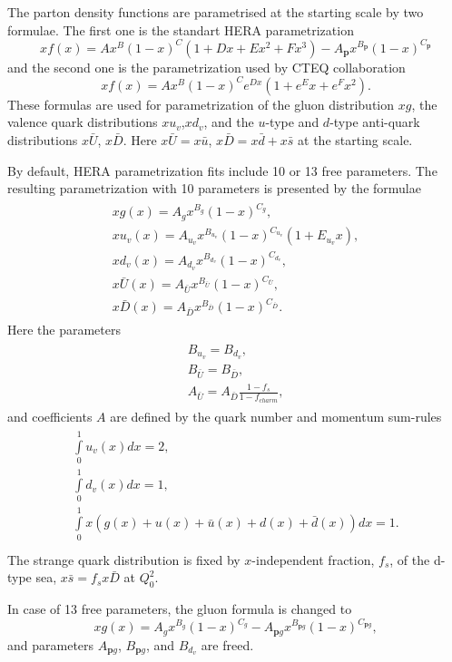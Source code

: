 
\label{sec:pdf}
The parton density functions are parametrised at the starting scale by two formulae.
The first one is the standart HERA parametrization
\begin{equation}
xf(x)=A x^{B} (1-x)^{C} (1+Dx+Ex^{2}+Fx^{3}) - A_{\mathbf{p}} x^{B_{\mathbf{p}}} (1-x)^{C_{\mathbf{p}}}
\label{pdf:herapara}
\end{equation}
and the second one is the parametrization used by CTEQ collaboration
\begin{equation}
xf(x)=A x^{B} (1-x)^{C} e^{Dx} (1+e^{E}x+e^{F}x^{2}).
\label{pdf:ctpara}
\end{equation}
These formulas are used for parametrization of the gluon distribution $xg$,
the valence quark distributions $xu_{v}$,$xd_{v}$,
and the $u$-type and $d$-type anti-quark distributions $x\bar{U}$, $x\bar{D}$.
Here $x\bar{U}=x\bar{u}$, $x\bar{D}=x\bar{d}+x\bar{s}$ at the starting scale.

By default, HERA parametrization fits include 10 or 13 free parameters.
The resulting parametrization with 10 parameters is presented by the formulae
\begin{eqnarray}
\begin{array}{c}
xg(x)=A_{g} x^{B_{g}} (1-x)^{C_{g}}, \\
xu_{v}(x)=A_{u_{v}} x^{B_{u_{v}}} (1-x)^{C_{u_{v}}} (1+E_{u_{v}}x), \\
xd_{v}(x)=A_{d_{v}} x^{B_{d_{v}}} (1-x)^{C_{d_{v}}}, \\
x\bar{U}(x)=A_{\bar{U}} x^{B_{\bar{U}}} (1-x)^{C_{\bar{U}}}, \\
x\bar{D}(x)=A_{\bar{D}} x^{B_{\bar{D}}} (1-x)^{C_{\bar{D}}}.
\end{array}
\end{eqnarray}
Here the parameters
\begin{eqnarray}
\begin{array}{c}
B_{u_{v}}=B_{d_{v}}, \\
B_{\bar{U}}=B_{\bar{D}},\\
A_{\bar{U}}=A_{\bar{D}}\frac{1-f_{s}}{1-f_{charm}},
\end{array}
\end{eqnarray}
and coefficients $A$ are defined by the quark number and momentum sum-rules
\begin{eqnarray}
\begin{array}{c}
\int\limits_{0}^{1} u_{v}(x) dx =2, \\
\int\limits_{0}^{1} d_{v}(x) dx =1, \\
\int\limits_{0}^{1} x \left( g(x)+u(x)+\bar{u}(x)+d(x)+\bar{d}(x) \right) dx =1. \\
\end{array}
\end{eqnarray}
The strange quark distribution is fixed by $x$-independent fraction, $f_{s}$,
of the d-type sea, $x\bar{s}=f_{s}x\bar{D}$ at $Q_{0}^{2}$.

In case of 13 free parameters, the gluon formula is changed to
\begin{equation}
xg(x)=A_{g} x^{B_{g}} (1-x)^{C_{g}} - A_{\mathbf{p}g} x^{B_{\mathbf{p}g}} (1-x)^{C_{\mathbf{p}g}},
\label{pdf:herag13par}
\end{equation}
and parameters $A_{\mathbf{p}g}$, $B_{\mathbf{p}g}$, and $B_{d_{v}}$ are freed.

